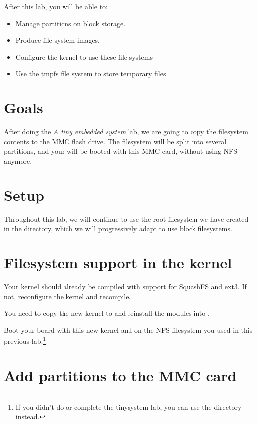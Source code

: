 
After this lab, you will be able to:
\begin{itemize}
\item Manage partitions on block storage.
\item Produce file system images.
\item Configure the kernel to use these file systems
\item Use the tmpfs file system to store temporary files
\end{itemize}

\section{Goals}

After doing the {\em A tiny embedded system} lab, we are going to copy
the filesystem contents to the MMC flash drive. The filesystem will be
split into several partitions, and your \devboard will be booted with
this MMC card, without using NFS anymore.

\section{Setup}

Throughout this lab, we will continue to use the root filesystem we
have created in the \nfsroot directory, which we will progressively adapt to use block filesystems.

\section{Filesystem support in the kernel}

Your kernel should already be compiled with support for SquashFS and ext3.
If not, reconfigure the kernel and recompile.

You need to copy the new kernel to  and reinstall 
the modules into \nfsroot.

Boot your board with this new kernel and on the NFS filesystem you
used in this previous lab.\footnote{If you didn't do or complete the
  tinysystem lab, you can use the  directory instead.}

\section{Add partitions to the MMC card}

